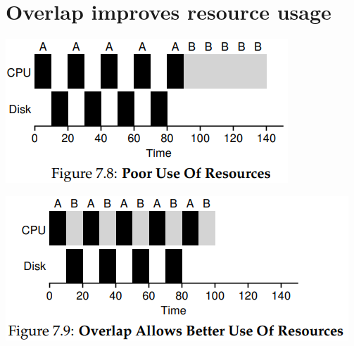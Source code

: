 \section*{Overlap improves resource usage}
\begin{minipage}{.45\linewidth}
  \includegraphics[width=\linewidth]{imgs/sched_io1}
\end{minipage}
\begin{minipage}{.55\linewidth}
  \includegraphics[width=\linewidth]{imgs/sched_io2}
\end{minipage}
